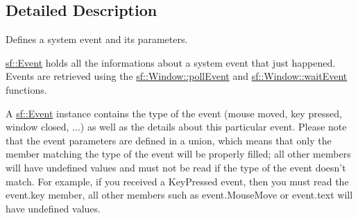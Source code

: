\subsection{Detailed Description}
Defines a system event and its parameters. 

\hyperlink{classsf_1_1Event}{sf\-::\-Event} holds all the informations about a system event that just happened. Events are retrieved using the \hyperlink{classsf_1_1Window_a338e996585faf82e93069858e3b531b7}{sf\-::\-Window\-::poll\-Event} and \hyperlink{classsf_1_1Window_aaf02ab64fbc1d374eef3696df54137bc}{sf\-::\-Window\-::wait\-Event} functions.

A \hyperlink{classsf_1_1Event}{sf\-::\-Event} instance contains the type of the event (mouse moved, key pressed, window closed, ...) as well as the details about this particular event. Please note that the event parameters are defined in a union, which means that only the member matching the type of the event will be properly filled; all other members will have undefined values and must not be read if the type of the event doesn't match. For example, if you received a Key\-Pressed event, then you must read the event.\-key member, all other members such as event.\-Mouse\-Move or event.\-text will have undefined values.


